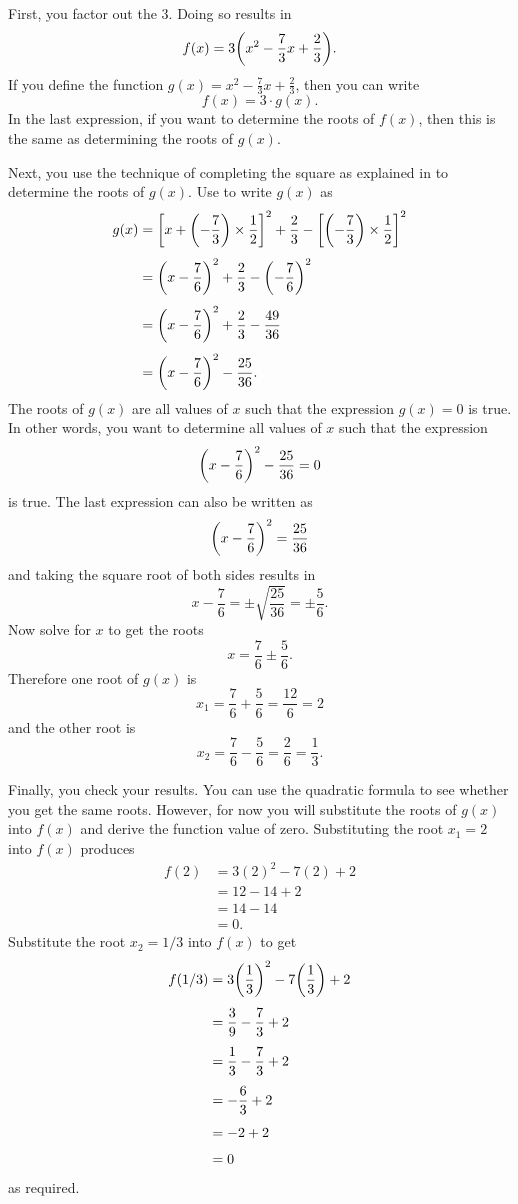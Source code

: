 \documentclass[a4paper,oneside,12pt]{article}
\begin{document}
\begin{solution}
First, you factor out the $3$.  Doing so results in
\[
f(x)
=
3
\parenthesis*{
  x^2 - \frac{7}{3}x + \frac{2}{3}
}.
\]
If you define the function $g(x) = x^2 - \frac{7}{3}x + \frac{2}{3}$,
then you can write
\[
f(x)
=
3 \cdot g(x).
\]
In the last expression, if you want to determine the roots of $f(x)$,
then this is the same as determining the roots of $g(x)$.

Next, you use the technique of completing the square as explained in
 to determine the roots of $g(x)$.
Use  to write $g(x)$ as
\begin{align*}
g(x)
&=
\squarebracket*{
  x
  +
  \parenthesis*{-\frac{7}{3}} \times \frac{1}{2}
}^2
+
\frac{2}{3}
-
\squarebracket*{
  \parenthesis*{-\frac{7}{3}} \times \frac{1}{2}
}^2 \\[4pt]
&=
\parenthesis*{
  x
  -
  \frac{7}{6}
}^2
+
\frac{2}{3}
-
\parenthesis*{-\frac{7}{6}}^2 \\[4pt]
&=
\parenthesis*{
  x
  -
  \frac{7}{6}
}^2
+
\frac{2}{3}
-
\frac{49}{36} \\[4pt]
&=
\parenthesis*{
  x
  -
  \frac{7}{6}
}^2
-
\frac{25}{36}.
\end{align*}
The roots of $g(x)$ are all values of $x$ such that the expression
$g(x) = 0$ is true.  In other words, you want to determine all values
of $x$ such that the expression
\[
\parenthesis*{
  x
  -
  \frac{7}{6}
}^2
-
\frac{25}{36}
=
0
\]
is true.  The last expression can also be written as
\[
\parenthesis*{
  x
  -
  \frac{7}{6}
}^2
=
\frac{25}{36}
\]
and taking the square root of both sides results in
\[
x - \frac{7}{6}
=
\pm
\sqrt{\frac{25}{36}}
=
\pm
\frac{5}{6}.
\]
Now solve for $x$ to get the roots
\[
x
=
\frac{7}{6} \pm \frac{5}{6}.
\]
Therefore one root of $g(x)$ is
\[
x_1
=
\frac{7}{6} + \frac{5}{6}
=
\frac{12}{6}
=
2
\]
and the other root is
\[
x_2
=
\frac{7}{6} - \frac{5}{6}
=
\frac{2}{6}
=
\frac{1}{3}.
\]

Finally, you check your results.  You can use the quadratic formula to
see whether you get the same roots.  However, for now you will
substitute the roots of $g(x)$ into $f(x)$ and derive the function
value of zero.  Substituting the root $x_1 = 2$ into $f(x)$ produces
\begin{align*}
f(2)
&=
3(2)^2 - 7(2) + 2 \\[4pt]
&=
12 - 14 + 2 \\[4pt]
&=
14 - 14 \\[4pt]
&=
0.
\end{align*}
Substitute the root $x_2 = 1 / 3$ into $f(x)$ to get
\begin{align*}
f(1/3)
&=
3\parenthesis*{\frac{1}{3}}^2
-
7\parenthesis*{\frac{1}{3}}
+
2 \\[4pt]
&=
\frac{3}{9}
-
\frac{7}{3}
+
2 \\[4pt]
&=
\frac{1}{3}
-
\frac{7}{3}
+
2 \\[4pt]
&=
-\frac{6}{3} + 2 \\[4pt]
&=
-2 + 2 \\[4pt]
&=
0
\end{align*}
as required.
\end{solution}
\end{document}
